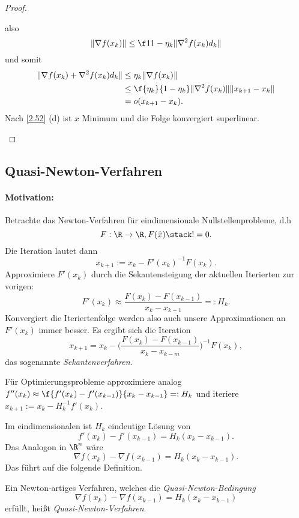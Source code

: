 \begin{st}
\begin{proof}
\begin{enumerate}[(a)]
				also
				\[
					\|\nabla f(x_k) \|
					\le \f 1{1 - \eta_k} \|\nabla^2 f(x_k) d_k\|
				\]
				und somit
				\begin{align*}
					\|\nabla f(x_k) + \nabla^2 f(x_k) d_k \|
					&\le \eta_k \|\nabla f(x_k)\| \\
					&\le \f {\eta_k}{1-\eta_k} \|\nabla^2 f(x_k)\|\|x_{k+1} - x_k\| \\
					&= o(x_{k+1} - x_k).
				\end{align*}
				Nach \ref{2.52} (d) ist $\hat x$ Minimum und die Folge konvergiert superlinear.
		\end{enumerate}
	\end{proof}
\end{st}

\subsection{Quasi-Newton-Verfahren}

\paragraph{Motivation:}

Betrachte das Newton-Verfahren für eindimensionale Nullstellenprobleme, d.h
\[
	F: \R \to \R, F(\hat x) \stack != 0.
\]
Die Iteration lautet dann
\[
	x_{k+1} := x_k - F'(x_k)^{-1} F(x_k).
\]
Approximiere $F'(x_k)$ durch die Sekantensteigung der aktuellen Iterierten zur vorigen:
\[
	F'(x_k) \approx \dfrac {F(x_k) - F(x_{k-1})}{x_k - x_{k-1}} =: H_k.
\]
Konvergiert die Iteriertenfolge werden also auch unsere Approximationen an $F'(x_k)$ immer besser.
Es ergibt sich die Iteration
\[
	x_{k+1} = x_k - \bigg(\dfrac{F(x_k) - F(x_{k-1})}{x_k - x_{k-m}} \bigg)^{-1} F(x_k),
\]
das sogenannte \emph{Sekantenverfahren}.

Für Optimierungsprobleme approximiere analog $f''(x_k) \approx \f {f'(x_k) - f'(x_{k-1})}{x_k - x_{k-1}} =: H_k$ und iteriere $x_{k+1} := x_k - H_k^{-1} f'(x_k)$.

Im eindimensionalen ist $H_k$ eindeutige Lösung von
\[
	f'(x_k) - f'(x_{k-1})
	= H_k (x_k - x_{k-1}).
\]
Das Analogon in $\R^n$ wäre
\[
	\nabla f(x_k) - \nabla f(x_{k-1})
	= H_k (x_k -x_{k-1}).
\]
Das führt auf die folgende Definition.

\begin{df*}
	Ein Newton-artiges Verfahren, welches die \emph{Quasi-Newton-Bedingung}
	\begin{equation} \label{eq:qn}
		\nabla f(x_k) - \nabla f(x_{k-1})
		= H_k (x_k -x_{k-1})
		\tag{QN}
	\end{equation}
	erfüllt, heißt \emph{Quasi-Newton-Verfahren}.
\end{df*}

